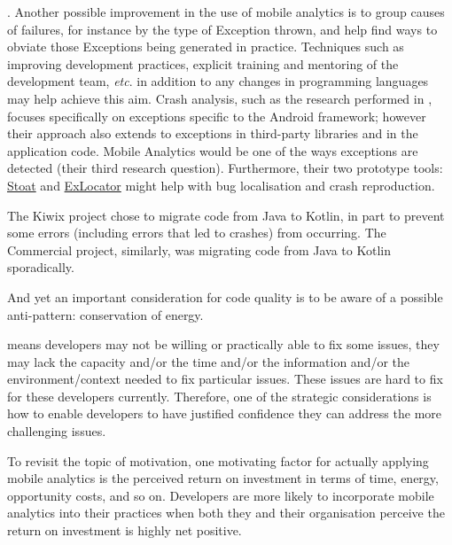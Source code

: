 . 
Another possible improvement in the use of mobile analytics is to group causes of failures, for instance by the type of Exception thrown, and help find ways to obviate those Exceptions being generated in practice. Techniques such as improving development practices, explicit training and mentoring of the development team, \emph{etc}. in addition to any changes in programming languages may help achieve this aim. %
Crash analysis, such as the research performed in , focuses specifically on exceptions specific to the Android framework; however their approach also extends to exceptions in third-party libraries and in the application code. Mobile Analytics would be one of the ways exceptions are detected (their third research question). Furthermore, their two prototype tools: \href{https://github.com/tingsu/Stoat}{Stoat} and \href{https://github.com/crashanalysis/ExLocator}{ExLocator} might help with bug localisation and crash reproduction.

The Kiwix project chose to migrate code from Java to Kotlin, in part to prevent some errors (including errors that led to crashes) from occurring. The Commercial project, similarly, was migrating code from Java to Kotlin sporadically.


And yet an important consideration for code quality is to be aware of a possible anti-pattern: conservation of energy.

means developers may not be willing or practically able to fix some issues, they may lack the capacity and/or the time and/or the information and/or the environment/context needed to fix particular issues. These issues are hard to fix for these developers currently.
%
Therefore, one of the strategic considerations is how to enable developers to have justified confidence they can address the more challenging issues.

To revisit the topic of motivation, one motivating factor for actually applying mobile analytics is the perceived return on investment in terms of time, energy, opportunity costs, and so on. Developers are more likely to incorporate mobile analytics into their practices when both they and their organisation perceive the return on investment is highly net positive.

